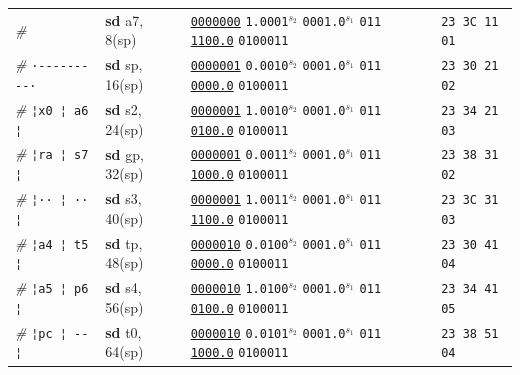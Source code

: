 \documentclass[a4paper,12pt,final]{article}
\begin{document}
\begin{table}[!htbp]
\begin{adjustwidth}{-1cm}{-1cm}
\begin{center}
\begin{tabular}{l|ll|l}
\emph{\#} & \textbf{sd} a7,    8(sp) & \uline{\texttt{0000000}} \texttt{1.0001}​\(^{s_{2}}\) \texttt{0001.0}​\(^{s_{1}}\) \texttt{011} \uline{\texttt{1100.0}} \texttt{0100011} & \texttt{23 3C 11 01}\\[0pt]
\emph{\#}\hspace{2.106000em} \texttt{·-{}-{}-{}-{}-{}-{}-{}-{}-·} & \textbf{sd} sp,   16(sp) & \uline{\texttt{0000001}} \texttt{0.0010}​\(^{s_{2}}\) \texttt{0001.0}​\(^{s_{1}}\) \texttt{011} \uline{\texttt{0000.0}} \texttt{0100011} & \texttt{23 30 21 02}\\[0pt]
\emph{\#}\hspace{2.106000em} \texttt{¦}​\hspace{0.526500em}​\texttt{x0 ¦ a6 ¦} & \textbf{sd} s2,   24(sp) & \uline{\texttt{0000001}} \texttt{1.0010}​\(^{s_{2}}\) \texttt{0001.0}​\(^{s_{1}}\) \texttt{011} \uline{\texttt{0100.0}} \texttt{0100011} & \texttt{23 34 21 03}\\[0pt]
\emph{\#}\hspace{2.106000em} \texttt{¦}​\hspace{0.526500em}​\texttt{ra ¦ s7 ¦} & \textbf{sd} gp,   32(sp) & \uline{\texttt{0000001}} \texttt{0.0011}​\(^{s_{2}}\) \texttt{0001.0}​\(^{s_{1}}\) \texttt{011} \uline{\texttt{1000.0}} \texttt{0100011} & \texttt{23 38 31 02}\\[0pt]
\emph{\#}\hspace{2.106000em} \texttt{¦}​\hspace{0.526500em}​\texttt{·· ¦ ·· ¦} & \textbf{sd} s3,   40(sp) & \uline{\texttt{0000001}} \texttt{1.0011}​\(^{s_{2}}\) \texttt{0001.0}​\(^{s_{1}}\) \texttt{011} \uline{\texttt{1100.0}} \texttt{0100011} & \texttt{23 3C 31 03}\\[0pt]
\emph{\#}\hspace{2.106000em} \texttt{¦}​\hspace{0.526500em}​\texttt{a4 ¦ t5 ¦} & \textbf{sd} tp,   48(sp) & \uline{\texttt{0000010}} \texttt{0.0100}​\(^{s_{2}}\) \texttt{0001.0}​\(^{s_{1}}\) \texttt{011} \uline{\texttt{0000.0}} \texttt{0100011} & \texttt{23 30 41 04}\\[0pt]
\emph{\#}\hspace{2.106000em} \texttt{¦}​\hspace{0.526500em}​\texttt{a5 ¦ p6 ¦} & \textbf{sd} s4,   56(sp) & \uline{\texttt{0000010}} \texttt{1.0100}​\(^{s_{2}}\) \texttt{0001.0}​\(^{s_{1}}\) \texttt{011} \uline{\texttt{0100.0}} \texttt{0100011} & \texttt{23 34 41 05}\\[0pt]
\emph{\#}\hspace{2.106000em} \texttt{¦}​\hspace{0.526500em}​\texttt{pc ¦ -{}-{} ¦} & \textbf{sd} t0,   64(sp) & \uline{\texttt{0000010}} \texttt{0.0101}​\(^{s_{2}}\) \texttt{0001.0}​\(^{s_{1}}\) \texttt{011} \uline{\texttt{1000.0}} \texttt{0100011} & \texttt{23 38 51 04}\\[0pt]

\end{tabular}
\end{center}
\end{adjustwidth}
\end{table}
\end{document}
